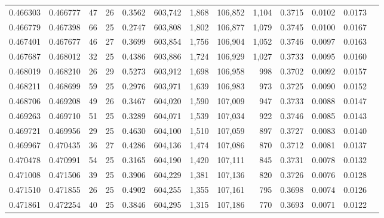 \begin{tabular}{rrrrrrrrrrrrr}
0.466303 & 0.466777 &    47 &  26 &                                     0.3562 & 603,742 &   1,868 & 106,852 &   1,104 & 0.3715 & 0.0102 & 0.0173 \\
0.466779 & 0.467398 &    66 &  25 &                                     0.2747 & 603,808 &   1,802 & 106,877 &   1,079 & 0.3745 & 0.0100 & 0.0167 \\
0.467401 & 0.467677 &    46 &  27 &                                     0.3699 & 603,854 &   1,756 & 106,904 &   1,052 & 0.3746 & 0.0097 & 0.0163 \\
0.467687 & 0.468012 &    32 &  25 &                                     0.4386 & 603,886 &   1,724 & 106,929 &   1,027 & 0.3733 & 0.0095 & 0.0160 \\
0.468019 & 0.468210 &    26 &  29 &                                     0.5273 & 603,912 &   1,698 & 106,958 &     998 & 0.3702 & 0.0092 & 0.0157 \\
0.468211 & 0.468699 &    59 &  25 &                                     0.2976 & 603,971 &   1,639 & 106,983 &     973 & 0.3725 & 0.0090 & 0.0152 \\
0.468706 & 0.469208 &    49 &  26 &                                     0.3467 & 604,020 &   1,590 & 107,009 &     947 & 0.3733 & 0.0088 & 0.0147 \\
0.469263 & 0.469710 &    51 &  25 &                                     0.3289 & 604,071 &   1,539 & 107,034 &     922 & 0.3746 & 0.0085 & 0.0143 \\
0.469721 & 0.469956 &    29 &  25 &                                     0.4630 & 604,100 &   1,510 & 107,059 &     897 & 0.3727 & 0.0083 & 0.0140 \\
0.469967 & 0.470435 &    36 &  27 &                                     0.4286 & 604,136 &   1,474 & 107,086 &     870 & 0.3712 & 0.0081 & 0.0137 \\
0.470478 & 0.470991 &    54 &  25 &                                     0.3165 & 604,190 &   1,420 & 107,111 &     845 & 0.3731 & 0.0078 & 0.0132 \\
0.471008 & 0.471506 &    39 &  25 &                                     0.3906 & 604,229 &   1,381 & 107,136 &     820 & 0.3726 & 0.0076 & 0.0128 \\
0.471510 & 0.471855 &    26 &  25 &                                     0.4902 & 604,255 &   1,355 & 107,161 &     795 & 0.3698 & 0.0074 & 0.0126 \\
0.471861 & 0.472254 &    40 &  25 &                                     0.3846 & 604,295 &   1,315 & 107,186 &     770 & 0.3693 & 0.0071 & 0.0122 \\

\end{tabular}
